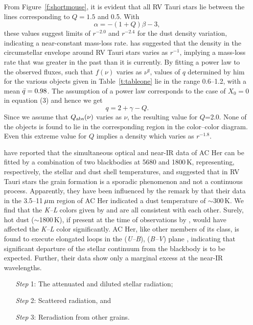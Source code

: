 \documentclass[useAMS,usenatbib]{biom}
\begin{document}
From Figure~\ref{f:shortmouse}, it is evident that all RV Tauri stars
lie between the lines corresponding to $Q=1.5$ and 0.5. With
 \[
  \alpha=-(1+Q)\beta-3,
 \]
 these values suggest limits of $r^{-2.0}$ and $r^{-2.4}$ for the dust
density variation, indicating a near-constant mass-loss rate.
\citet{b12} has suggested that the density in the circumstellar
envelope around RV Tauri stars varies as $r^{-1}$, implying a
mass-loss rate that was greater in the past than it is currently.  By
fitting a power law to the observed fluxes, such that $f(\nu)$ varies
as $\nu^q$, values of $q$ determined by him for the various objects
given in Table~\ref{t:tableone} lie in the range 0.6--1.2, with a mean
$\skew5\bar q=0.98$. The assumption of a power law corresponds to the
case of $X_0=0$ in equation (3) and hence we get
 \[
  q=2+\gamma -Q.
 \]
Since we assume that $Q_{{\mathrm{abs}}}(\nu)$ varies as $\nu$, the
resulting value for $Q$=2.0. None of the objects is found to lie in the
corresponding region in the color--color diagram. Even this extreme
value for $Q$ implies a density which varies as $r^{-1.8}$.

\citet{b9} have reported that the simultaneous optical and near-IR
data of AC Her can be fitted by a combination of two blackbodies
at 5680 and 1800\,K, representing, respectively, the stellar and
dust shell temperatures, and suggested that in RV Tauri stars the
grain formation is a sporadic phenomenon and not a continuous
process. Apparently, they have been influenced by the remark by
\citet{b7} that their data in the 3.5--11$\,\mu$m region of AC
Her indicated a dust temperature of $\sim$300\,K. We find that the
{\it K--L\/} colors given by \citet{b5} and
\citet{b9} are all consistent with each other. Surely, hot dust
($\sim$1800\,K), if present at the time of observations by
\citet{b9}, would have affected the {\it K--L\/} color
significantly. AC Her, like other members of its class, is found
to execute elongated loops in the ({\it U--B\/}), ({\it B--V\/})
plane \citep{b20}, indicating that significant departure of the
stellar continuum from the blackbody is to be expected. Further,
their data show only a marginal excess at the near-IR wavelengths.\vspace*{-4pt}
\begin{enumerate}
\item[{\it Step} 1:] The attenuated and diluted stellar radiation;
\item[{\it Step} 2:] Scattered radiation, and
\item[{\it Step} 3:] Reradiation from other grains.\vspace*{-8pt}
\end{enumerate}
\end{document}
